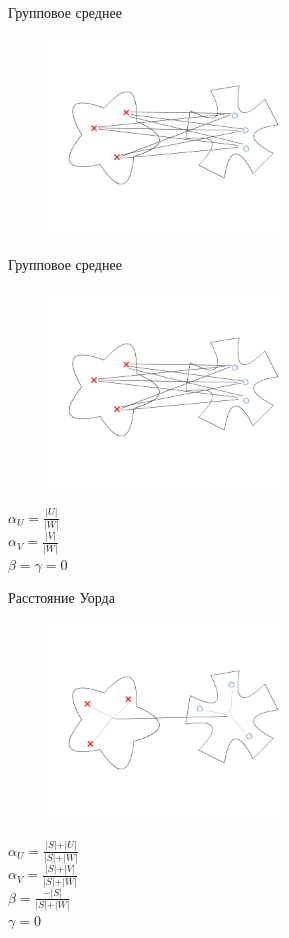 \documentclass[10pt]{beamer}
\begin{document}
\begin{frame}{Групповое среднее}
	\begin{figure}[htbp]
	  \includegraphics[height=150pt, keepaspectratio = true]{images/lans3}  
	\end{figure}
\end{frame}

\begin{frame}{Групповое среднее}
	\begin{figure}[htbp]
	  \includegraphics[height=150pt, keepaspectratio = true]{images/lans3}  
	\end{figure}
	${\alpha_U = \frac{\vert U \vert}{\vert W \vert}}$\\${\alpha_V = \frac{\vert V \vert}{\vert W \vert}}$ \\${\beta = \gamma = 0}$
\end{frame}

\begin{frame}{Расстояние Уорда}
	\begin{figure}[htbp]
	  \includegraphics[height=150pt, keepaspectratio = true]{images/lans4}  
	\end{figure}

  ${\alpha_U = \frac{\vert S \vert + \vert U \vert}{\vert S \vert + \vert W \vert}}$\\${\alpha_V = \frac{\vert S \vert + \vert V \vert}{\vert S \vert + \vert W \vert}}$ \\${\beta = \frac{ -\vert S \vert}{\vert S \vert + \vert W \vert}}$ \\${\gamma = 0}$
\end{frame}
\end{document}
